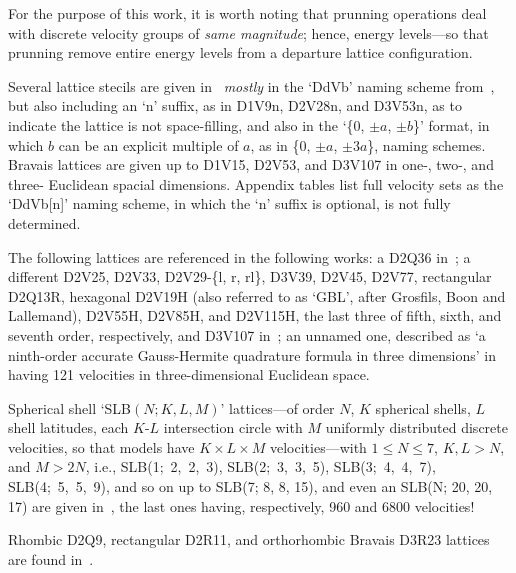     For the purpose of this work, it is worth noting that prunning operations deal with discrete velocity groups  of  \emph{same
    magnitude}; hence, energy levels---so that prunning remove entire energy levels from a departure lattice configuration.

    Several lattice stecils are given in~\cite{2009-SurmasR+PhilippiPC-EurPhysJSpecialTopics} \emph{mostly} in the `DdVb' naming
    scheme from~\cite{2006-PhilippiPC+SurmasR-PhysRevE}, but also including an `n' suffix, as in D1V9n, D2V28n, and  D3V53n,  as
    to indicate the lattice is not space-filling, and also in the `\{$0$, $\pm a$, $\pm b$\}' format, in which  $b$  can  be  an
    explicit multiple of $a$, as in \{$0$, $\pm a$, $\pm 3a$\}, naming schemes. Bravais lattices are given up to  D1V15,  D2V53,
    and D3V107 in one-, two-, and three- Euclidean spacial dimensions. Appendix tables list full velocity sets as the  `DdVb[n]'
    naming scheme, in which the `n' suffix is optional, is not fully determined.

    The      following      lattices      are      referenced      in       the       following       works:       a       D2Q36
    in~\cite[p.~452]{2010-AidunCK+ClausenJR-AnnuRevFluidMech}; a different D2V25,  D2V33,  D2V29-\{l,  r,  rl\},  D3V39,  D2V45,
    D2V77, rectangular D2Q13R, hexagonal D2V19H (also referred to as `GBL', after Grosfils, Boon and Lallemand), D2V55H, D2V85H,
    and D2V115H, the last three of fifth, sixth, and seventh order, respectively, and D3V107 in~\cite{2010-HegeleLA-DrUFSC};  an
    unnamed  one,  described  as   `a   ninth-order   accurate   Gauss-Hermite   quadrature   formula   in   three   dimensions'
    in~\cite{2008-NieX+ChenH-PhysRevE} having 121 velocities in three-dimensional Euclidean space.

    Spherical shell `SLB$(N; K, L, M)$' lattices---of order $N$,  $K$  spherical  shells,  $L$  shell  latitudes,  each  $K$-$L$
    intersection circle with $M$ uniformly distributed  discrete  velocities,  so  that  models  have  $K  \times  L  \times  M$
    velocities---with $1 \leqslant N \leqslant  7$,  $K,  L  >  N$,  and  $M  >  2N$,  i.e.,  SLB(1;~2,~2,~3),  SLB(2;~3,~3,~5),
    SLB(3;~4,~4,~7), SLB(4;~5,~5,~9), and so  on  up  to  SLB(7;  8,  8,  15),  and  even  an  SLB(N;  20,  20,  17)  are  given
    in~\cite{2012-AmbrusVE+SofoneaV-PhysRevE}, the last ones having, respectively, 960 and 6800 velocities!

    Rhombic     D2Q9,     rectangular     D2R11,     and     orthorhombic     Bravais     D3R23     lattices      are      found
    in~\cite{2013-HegeleJr+PhilippiPC-JSciComput}.

